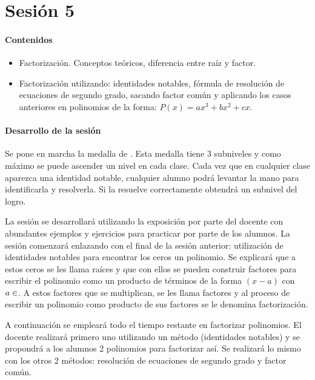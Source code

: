 \section{Sesión 5}


\paragraph{Contenidos}
\begin{itemize}
	\item Factorización. Conceptos teóricos, diferencia entre raíz y factor.
	\item Factorización utilizando: identidades notables, fórmula de resolución de ecuaciones de segundo grado, sacando factor común y aplicando los casos anteriores en polinomios de la forma: $P(x) = ax^3+bx^2+cx$.
\end{itemize}

\paragraph{Desarrollo de la sesión}

Se pone en marcha la medalla de .
%
Esta medalla tiene 3 subniveles y como máximo se puede ascender un nivel en cada clase.
%
Cada vez que en cualquier clase aparezca una identidad notable, cualquier alumno podrá levantar la mano para identificarla y resolverla. 
%
Si la resuelve correctamente obtendrá un subnivel del logro.

La sesión se desarrollará utilizando la exposición por parte del docente con abundantes ejemplos y ejercicios para practicar por parte de los alumnos.
%
La sesión comenzará enlazando con el final de la sesión anterior: utilización de identidades notables para encontrar los ceros un polinomio.
%
Se explicará que a estos ceros se les llama raíces y que con ellos se pueden construir factores para escribir el polinomio como un producto de términos de la forma $(x-a)$ con $a\in\real$.
%
A estos factores que se multiplican, se les llama factores y al proceso de escribir un polinomio como producto de sus factores se le denomina factorización.

A continuación se empleará todo el tiempo restante en factorizar polinomios.
%
El docente realizará primero uno utilizando un método (identidades notables) y se propondrá a los alumnos 2 polinomios para factorizar así.
%
Se realizará lo mismo con los otros 2 métodos: resolución de ecuaciones de segundo grado y factor común.

